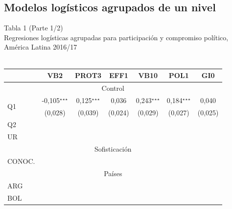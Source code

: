 \documentclass[a4paper]{tufte-handout}
\begin{document}
\subsection[Modelos logísticos agrupados de un nivel] {Modelos logísticos agrupados de un nivel}


\begin{table}[h]
  \centering
  \selectfont
   \smallskip\noindent\small Tabla 1 (Parte 1/2) \\ Regresiones logísticas agrupadas para participación y compromiso político, América Latina 2016/17  \\~\\
  \begin{tabular}{l c c c c c c}
    \toprule
     & VB2 & PROT3 & EFF1 & VB10 & POL1 & GI0 \\ \midrule
    \multicolumn{7}{c}{Control} \\ \midrule
    \multirow{2}{*}{Q1} & -0,105$^\star$$^\star$$^\star$ & 0,125$^\star$$^\star$$^\star$ & 0,036 & 0,243$^\star$$^\star$$^\star$ & 0,184$^\star$$^\star$$^\star$ & 0,040 \\
    & {\scriptsize (0,028)} & {\scriptsize (0,039)} & {\scriptsize (0,024)} & {\scriptsize (0,029)} & {\scriptsize (0,027)} & {\scriptsize (0,025)} \\ 
    \multirow{2}{*}{Q2} & & & & & & \\
    & & & & & & \\
    \multirow{2}{*}{UR} & & & & & & \\
    & & & & & & \\ \midrule
    \multicolumn{7}{c}{Sofisticación} \\ \midrule
    \multirow{2}{*}{CONOC.} & & & & & & \\
    & & & & & & \\ \midrule
    \multicolumn{7}{c}{Países} \\ \midrule
    \multirow{2}{*}{ARG} & & & & & & \\
    & & & & & & \\
    \multirow{2}{*}{BOL} & & & & & & \\

\end{tabular}
\end{table}
\end{document}

